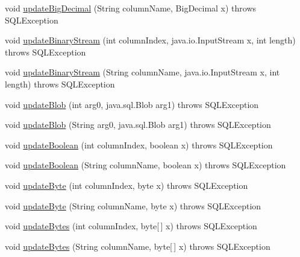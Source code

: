 \begin{DoxyCompactItemize}
\item 
void \mbox{\hyperlink{classcom_1_1mysql_1_1jdbc_1_1_result_set_impl_aa70d9b9fa31249d079cd0c75eab4eacf}{update\+Big\+Decimal}} (String column\+Name, Big\+Decimal x)  throws S\+Q\+L\+Exception 
\item 
void \mbox{\hyperlink{classcom_1_1mysql_1_1jdbc_1_1_result_set_impl_a89ab2f792bec03ec7dc3bbb925aa1239}{update\+Binary\+Stream}} (int column\+Index, java.\+io.\+Input\+Stream x, int length)  throws S\+Q\+L\+Exception 
\item 
void \mbox{\hyperlink{classcom_1_1mysql_1_1jdbc_1_1_result_set_impl_a765e098c773712037e65934873f8af01}{update\+Binary\+Stream}} (String column\+Name, java.\+io.\+Input\+Stream x, int length)  throws S\+Q\+L\+Exception 
\item 
void \mbox{\hyperlink{classcom_1_1mysql_1_1jdbc_1_1_result_set_impl_a05a36c9cac14578759f6246d67321439}{update\+Blob}} (int arg0, java.\+sql.\+Blob arg1)  throws S\+Q\+L\+Exception 
\item 
void \mbox{\hyperlink{classcom_1_1mysql_1_1jdbc_1_1_result_set_impl_a9c8337c305d3d92c2f94fd6aef04566d}{update\+Blob}} (String arg0, java.\+sql.\+Blob arg1)  throws S\+Q\+L\+Exception 
\item 
void \mbox{\hyperlink{classcom_1_1mysql_1_1jdbc_1_1_result_set_impl_a60710525a754d8fe76c4ff0f963ff1f7}{update\+Boolean}} (int column\+Index, boolean x)  throws S\+Q\+L\+Exception 
\item 
void \mbox{\hyperlink{classcom_1_1mysql_1_1jdbc_1_1_result_set_impl_a94e7117ecf4f1109efc090bea53a95eb}{update\+Boolean}} (String column\+Name, boolean x)  throws S\+Q\+L\+Exception 
\item 
void \mbox{\hyperlink{classcom_1_1mysql_1_1jdbc_1_1_result_set_impl_a259de718d0b71b68adc144272b315a24}{update\+Byte}} (int column\+Index, byte x)  throws S\+Q\+L\+Exception 
\item 
void \mbox{\hyperlink{classcom_1_1mysql_1_1jdbc_1_1_result_set_impl_a81493e206e4e56cca567213fe7ae5973}{update\+Byte}} (String column\+Name, byte x)  throws S\+Q\+L\+Exception 
\item 
void \mbox{\hyperlink{classcom_1_1mysql_1_1jdbc_1_1_result_set_impl_ad8cd4a78e2a5df6084ee649f05cc83eb}{update\+Bytes}} (int column\+Index, byte\mbox{[}$\,$\mbox{]} x)  throws S\+Q\+L\+Exception 
\item 
void \mbox{\hyperlink{classcom_1_1mysql_1_1jdbc_1_1_result_set_impl_a187964b00b0acfd59bb49bf015c3911e}{update\+Bytes}} (String column\+Name, byte\mbox{[}$\,$\mbox{]} x)  throws S\+Q\+L\+Exception 

\end{DoxyCompactItemize}

